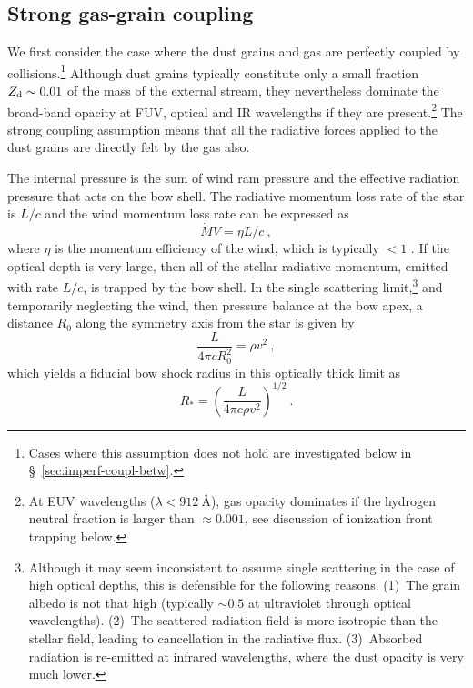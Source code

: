 \subsection{Strong gas-grain coupling}
\label{sec:strong-gas-grain}

We first consider the case where the dust grains and gas are perfectly
coupled by collisions.\footnote{%
  Cases where this assumption does not hold are investigated below in
  \S~\ref{sec:imperf-coupl-betw}.} %
Although dust grains typically constitute only a small fraction
\(Z_{\text{d}} \sim 0.01\) of the mass of the external stream, they
nevertheless dominate the broad-band opacity at FUV, optical and IR
wavelengths if they are present.\footnote{%
  At EUV wavelengths (\(\lambda < \SI{912}{\angstrom}\)), gas opacity
  dominates if the hydrogen neutral fraction is larger than
  \(\approx 0.001\), see discussion of ionization front trapping
  below.} %
The strong coupling assumption means that all the radiative forces
applied to the dust grains are directly felt by the gas also.

The internal pressure is the sum of wind ram pressure and the
effective radiation pressure that acts on the bow shell.  The
radiative momentum loss rate of the star is \(L/c\) and the wind
momentum loss rate can be expressed as
\begin{equation}
  \label{eq:wind-efficiency}
  \dot{M} V = \eta L / c \ , 
\end{equation}
where \(\eta\) is the momentum efficiency of the wind, which is typically
\(< 1\) \citep{Lamers:1999b}. If the optical depth is very large, then
all of the stellar radiative momentum, emitted with rate \(L/c\), is
trapped by the bow shell.  In the single scattering limit,\footnote{%
  Although it may seem inconsistent to assume single scattering in the
  case of high optical depths, this is defensible for the following
  reasons. (1)~The grain albedo is not that high (typically
  \(\sim 0.5\) at ultraviolet through optical wavelengths). (2)~The
  scattered radiation field is more isotropic than the stellar field,
  leading to cancellation in the radiative
  flux. (3)~Absorbed radiation is re-emitted at infrared
  wavelengths, where the dust opacity is very much lower.} %
and temporarily neglecting the wind, then pressure balance at the bow
apex, a distance \(R_0\) along the symmetry axis from the star is
given by
\begin{equation}
  \label{eq:rad-press-balance-thick}
  \frac{L}{4 \pi c R_0^2} = \rho v^2 \ ,
\end{equation}
which yields a fiducial bow shock radius in this optically thick limit
as
\begin{equation}
  \label{eq:Rstar}
  R_* = \left(\frac{L}{4\pi c \rho v^2}\right)^{1/2} \ .
\end{equation}

